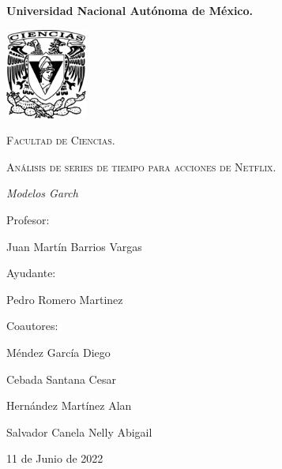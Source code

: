 \begin{titlepage}
    \centering
    {\bfseries\LARGE Universidad Nacional Autónoma de México. \par}
    \vspace{1cm}
    {\includegraphics[width=0.2\textwidth]{Graficos/logo.png}\par}
    {\scshape\Large Facultad de Ciencias. \par}
    \vspace{1cm}
    {\scshape\Huge Análisis de series de tiempo para acciones de Netflix. \par}
    \vspace{1cm}
    {\itshape\Large Modelos Garch \par}
    \vfill
    {\Large Profesor: \par}
    {\Large Juan Martín Barrios Vargas \par}
    \vfill
    {\Large Ayudante: \par}
    {\Large Pedro Romero Martinez \par}
    \vfill
    {\Large Coautores: \par}
    {\Large  Méndez García Diego \par}
     {\Large  Cebada Santana Cesar \par}
     {\Large  Hernández Martínez Alan \par}
      {\Large  Salvador Canela Nelly Abigail \par}
    \vfill
    {\Large 11 de Junio de 2022 \par}
\end{titlepage}
